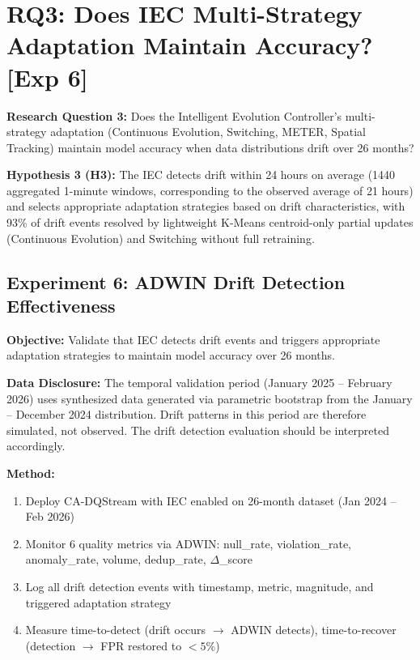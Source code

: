 \section{RQ3: Does IEC Multi-Strategy Adaptation Maintain Accuracy? [Exp 6]}

\textbf{Research Question 3:} Does the Intelligent Evolution Controller's multi-strategy adaptation (Continuous Evolution, Switching, METER, Spatial Tracking) maintain model accuracy when data distributions drift over 26 months?

\textbf{Hypothesis 3 (H3):} The IEC detects drift within 24 hours on average (1440 aggregated 1-minute windows, corresponding to the observed average of 21 hours) and selects appropriate adaptation strategies based on drift characteristics, with 93\% of drift events resolved by lightweight K-Means centroid-only partial updates (Continuous Evolution) and Switching without full retraining.

\subsection{Experiment 6: ADWIN Drift Detection Effectiveness}

\textbf{Objective:} Validate that IEC detects drift events and triggers appropriate adaptation strategies to maintain model accuracy over 26 months.

\textbf{Data Disclosure:} The temporal validation period (January 2025 -- February 2026) uses synthesized data generated via parametric bootstrap from the January -- December 2024 distribution. Drift patterns in this period are therefore simulated, not observed. The drift detection evaluation should be interpreted accordingly.

\textbf{Method:}
\begin{enumerate}
    \item Deploy CA-DQStream with IEC enabled on 26-month dataset (Jan 2024 -- Feb 2026)
    \item Monitor 6 quality metrics via ADWIN: null\_rate, violation\_rate, anomaly\_rate, volume, dedup\_rate, $\Delta$\_score
    \item Log all drift detection events with timestamp, metric, magnitude, and triggered adaptation strategy
    \item Measure time-to-detect (drift occurs $\to$ ADWIN detects), time-to-recover (detection $\to$ FPR restored to $<5\%$)
\end{enumerate}

